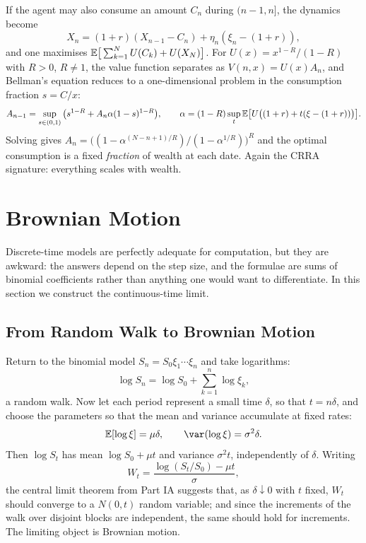 \documentclass[a4paper]{scrartcl}
\begin{document}
\begin{example}
	If the agent may also consume an amount $C_n$ during $(n-1,n]$, the dynamics become
	$$
	X_n = (1+r)(X_{n-1}-C_n) + \eta_n(\xi_n - (1+r)),
	$$
	and one maximises $\mathbb{E}\big[\sum_{k=1}^N U(C_k) + U(X_N)\big]$. For $U(x) = x^{1-R}/(1-R)$ with $R>0$, $R\neq1$, the value function separates as $V(n,x) = U(x)A_n$, and Bellman's equation reduces to a one-dimensional problem in the consumption fraction $s = C/x$:
	$$
	A_{n-1} = \sup_{s\in(0,1)}\big(s^{1-R} + A_n\alpha(1-s)^{1-R}\big), \qquad \alpha = (1-R)\sup_t \mathbb{E}\big[U\big((1+r)+t(\xi-(1+r))\big)\big].
	$$
	Solving gives $A_n = \big((1-\alpha^{(N-n+1)/R})/(1-\alpha^{1/R})\big)^R$ and the optimal consumption is a fixed \emph{fraction} of wealth at each date. Again the CRRA signature: everything scales with wealth.
\end{example}

\section{Brownian Motion}

Discrete-time models are perfectly adequate for computation, but they are awkward: the answers depend on the step size, and the formulae are sums of binomial coefficients rather than anything one would want to differentiate. In this section we construct the continuous-time limit.

\subsection{From Random Walk to Brownian Motion}

Return to the binomial model $S_n = S_0\xi_1\cdots\xi_n$ and take logarithms:
$$
\log S_n = \log S_0 + \sum_{k=1}^n \log \xi_k,
$$
a random walk. Now let each period represent a small time $\delta$, so that $t = n\delta$, and choose the parameters so that the mean and variance accumulate at fixed rates:
$$
\EE[\log\xi] = \mu\delta, \qquad \var(\log\xi) = \sigma^2\delta.
$$
Then $\log S_t$ has mean $\log S_0 + \mu t$ and variance $\sigma^2 t$, independently of $\delta$. Writing
$$
W_t = \frac{\log(S_t/S_0) - \mu t}{\sigma},
$$
the central limit theorem from Part IA suggests that, as $\delta \downarrow 0$ with $t$ fixed, $W_t$ should converge to a $N(0,t)$ random variable; and since the increments of the walk over disjoint blocks are independent, the same should hold for increments. The limiting object is Brownian motion.
\end{document}
